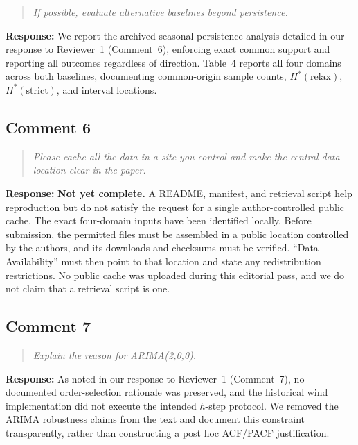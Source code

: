 \documentclass[11pt,a4paper]{article}
\let\originalsubsection\subsection
\renewcommand{\subsection}{\Needspace{9\baselineskip}\originalsubsection}
\newenvironment{reviewcomment}
  {\begin{quote}\itshape}
  {\end{quote}}
\newcommand{\response}{\noindent\textbf{Response:} }
\begin{document}
\begin{reviewcomment}
If possible, evaluate alternative baselines beyond persistence.
\end{reviewcomment}

\response
We report the archived seasonal-persistence analysis
detailed in our response to Reviewer~1 (Comment~6), enforcing exact common
support and reporting all outcomes regardless of direction. Table~4 reports
all four domains across both baselines, documenting common-origin sample
counts, $H^*(\mathrm{relax})$, $H^*(\mathrm{strict})$, and interval locations.


\subsection*{Comment 6}

\begin{reviewcomment}
Please cache all the data in a site you control and make the central
data location clear in the paper.
\end{reviewcomment}

\response
\textbf{Not yet complete.} A README, manifest, and retrieval script help
reproduction but do not satisfy the request for a single author-controlled
public cache. The exact four-domain inputs have been identified locally.
Before submission, the permitted files must be assembled in a public
location controlled by the authors, and its downloads and checksums must
be verified. ``Data Availability'' must then point to that location and
state any redistribution restrictions. No public cache was uploaded during
this editorial pass, and we do not claim that a retrieval script is one.


\subsection*{Comment 7}

\begin{reviewcomment}
Explain the reason for ARIMA(2,0,0).
\end{reviewcomment}

\response
As noted in our response to Reviewer~1 (Comment~7), no documented
order-selection rationale was preserved, and the historical wind implementation
did not execute the intended $h$-step protocol. We removed the ARIMA robustness
claims from the text and document this constraint transparently, rather than
constructing a post hoc ACF/PACF justification.
\end{document}
